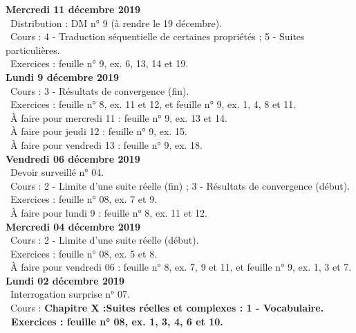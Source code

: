 \documentclass[12pt,a4paper]{article}
\begin{document}
\noindent\textbf{\bf Mercredi 11 décembre 2019}\\
\bu\ Distribution : DM n° 9 (à rendre le 19 décembre).\\
\bu\ Cours : 4 - Traduction séquentielle de certaines propriétés ; 5 - Suites particulières.\\
\bu\ Exercices : feuille n° 9, ex. 6, 13, 14 et 19.\vspace{.4cm}\\ 

\noindent\textbf{Lundi 9 décembre 2019}\\
\bu\ Cours : 3 - Résultats de convergence (fin).\\
\bu\ Exercices : feuille n° 8, ex. 11 et 12, et feuille n° 9, ex. 1, 4, 8 et 11.\\ 
\bu\ À faire pour mercredi 11 : feuille n° 9, ex. 13 et 14.\\
\bu\ À faire pour jeudi 12 : feuille n° 9, ex. 15.\\
\bu\ À faire pour vendredi 13 : feuille n° 9, ex. 18.\vspace{.4cm}\\

\noindent\textbf{Vendredi 06 décembre 2019}\\
\bu\ Devoir surveillé n° 04.\\
\bu\ Cours : 2 - Limite d'une suite réelle (fin) ; 3 - Résultats de convergence (début).\\
\bu\ Exercices : feuille n° 08, ex. 7 et 9.\\
\bu\ À faire pour lundi 9 : feuille n° 8, ex. 11 et 12.\vspace{.4cm}\\
  
\noindent\textbf{Mercredi 04 décembre 2019}\\
\bu\ Cours : 2 - Limite d'une suite réelle (début).\\
\bu\ Exercices : feuille n° 08, ex. 5 et 8.\\
\bu\ À faire pour vendredi 06 : feuille n° 8, ex. 7, 9 et 11, et feuille n° 9, ex. 1, 3 et 7.\vspace{.4cm}\\

\noindent\textbf{Lundi 02 décembre 2019}\\
\bu\ Interrogation surprise n° 07.\\
\bu\ Cours : \bf Chapitre X :\rm Suites réelles et complexes : 1 - Vocabulaire.
\\
\bu\ Exercices : feuille n° 08, ex. 1, 3, 4, 6 et 10.\vspace{.4cm}\\
\end{document}
